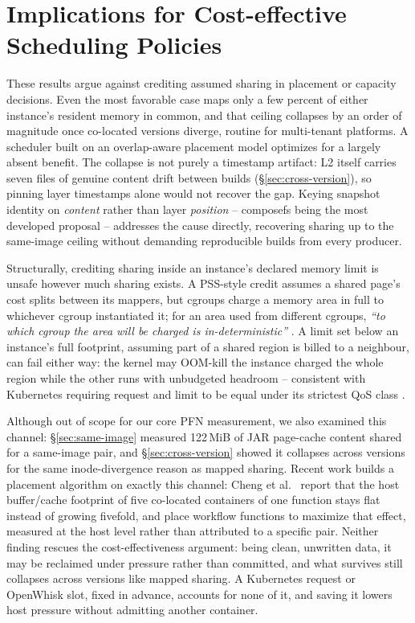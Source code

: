 \documentclass[sigplan,10pt,natbib=false]{acmart}
\begin{document}
\section{Implications for Cost-effective Scheduling Policies}
\label{sec:implications}

These results argue against crediting assumed sharing in placement or
capacity decisions. Even the most favorable case maps only a few
percent of either instance's resident memory in common, and that
ceiling collapses by an order of magnitude once co-located versions
diverge, routine for multi-tenant platforms. A scheduler built on an
overlap-aware placement model \cite{bravo2017more} optimizes
for a largely absent benefit. The collapse is not purely a timestamp
artifact: L2 itself carries seven files of genuine content drift
between builds (\S\ref{sec:cross-version}), so pinning layer timestamps
alone would not recover the gap. Keying snapshot identity on
\emph{content} rather than layer \emph{position} -- composefs
\cite{composefs} being the most developed proposal -- addresses the
cause directly, recovering sharing up to the same-image ceiling without
demanding reproducible builds from every producer.

Structurally, crediting sharing inside an instance's declared memory
limit is unsafe however much sharing exists. A PSS-style credit
assumes a shared page's cost splits between its mappers, but cgroups
charge a memory area in full to whichever cgroup instantiated it; for
an area used from different cgroups, \emph{``to which cgroup the area
will be charged is in-deterministic''} \cite{kernelcg}. A limit set
below an instance's full footprint, assuming part of a shared region is
billed to a neighbour, can fail either way: the kernel may OOM-kill the
instance charged the whole region while the other runs with unbudgeted
headroom -- consistent with Kubernetes requiring request and limit to
be equal under its strictest QoS class \cite{k8sqos}.

Although out of scope for our core PFN measurement, we also examined
this channel: \S\ref{sec:same-image} measured 122\,MiB of JAR
page-cache content shared for a same-image pair, and
\S\ref{sec:cross-version} showed it collapses across versions for the
same inode-divergence reason as mapped sharing. Recent work builds a
placement algorithm on exactly this channel: Cheng et al.\
\cite{cheng2024slo} report that the host buffer/cache footprint of
five co-located containers of one function stays flat instead of
growing fivefold, and place workflow functions to maximize that
effect, measured at the host level rather than attributed to a
specific pair. Neither finding rescues the cost-effectiveness argument: being clean,
unwritten data, it may be reclaimed under pressure rather than
committed, and what survives still collapses across versions like
mapped sharing. A Kubernetes request or OpenWhisk slot, fixed in
advance, accounts for none of it, and saving it lowers host pressure
without admitting another container.
\end{document}
